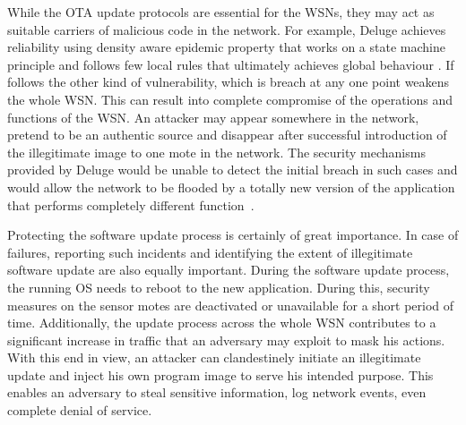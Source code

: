 \documentclass[conference,final]{IEEEtran}
\begin{document}
While the OTA update protocols are essential for the WSNs, they may act as suitable carriers of malicious code in the network.
For example, Deluge achieves reliability using density aware epidemic property that works on a state machine principle and follows few local rules that ultimately achieves global behaviour \cite{1031506}.
If follows the other kind of vulnerability, which is breach at any one point weakens the whole WSN. 
This can result into complete compromise of the operations and functions of the WSN.
An attacker may appear somewhere in the network, pretend to be an authentic source and disappear after successful introduction of the illegitimate image to one mote in the network. 
The security mechanisms provided by Deluge would be unable to detect the initial breach in such cases and would allow the network to be flooded by a totally new version of the application that performs completely different function~\cite{Karlof:2004:TLL:1031495.1031515}.

Protecting the software update process is certainly of great importance.
In case of failures, reporting such incidents and identifying the extent of illegitimate software update are also equally important.
During the software update process, the running OS needs to reboot to the new application. 
During this, security  measures on the sensor motes are deactivated or unavailable for a short period of time.
Additionally, the update process across the whole WSN contributes to a significant increase in traffic that an adversary may exploit to  mask his actions. 
With this end in view, an attacker can clandestinely initiate an illegitimate update and inject his own program image to serve his intended purpose.
This enables an adversary to steal sensitive information, log network events, even complete denial of service. 
\end{document}
